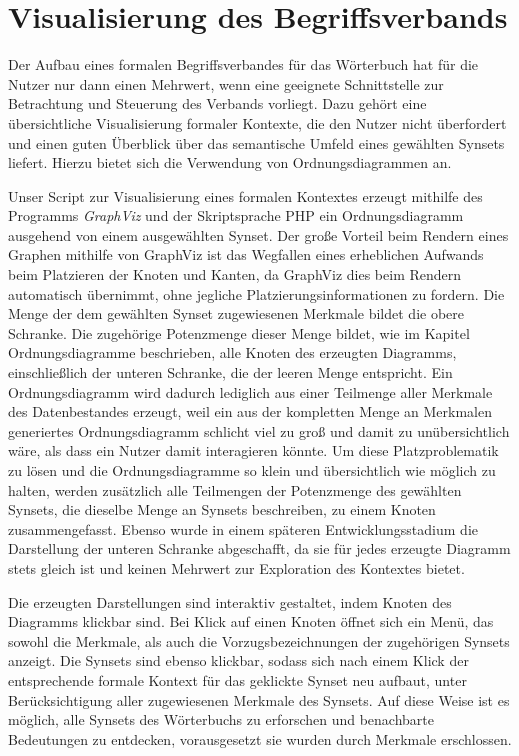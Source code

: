 \documentclass[pagesize,paper=A4,DIV=calc,fontsize=12pt,draft=false]{scrreprt}
\begin{document}
\section{Visualisierung des Begriffsverbands}

Der Aufbau eines formalen Begriffsverbandes für das Wörterbuch hat für die Nutzer nur dann einen Mehrwert, wenn eine geeignete Schnittstelle zur Betrachtung und Steuerung des Verbands vorliegt. 
Dazu gehört eine übersichtliche Visualisierung formaler Kontexte, die den Nutzer nicht überfordert und einen guten Überblick über das semantische Umfeld eines gewählten Synsets liefert.
Hierzu bietet sich die Verwendung von Ordnungsdiagrammen an. 

Unser Script zur Visualisierung eines formalen Kontextes erzeugt mithilfe des Programms \emph{GraphViz} und der Skriptsprache PHP ein Ordnungsdiagramm ausgehend von einem ausgewählten Synset. 
Der große Vorteil beim Rendern eines Graphen mithilfe von GraphViz ist das Wegfallen eines erheblichen Aufwands beim Platzieren der Knoten und Kanten, da GraphViz dies beim Rendern automatisch übernimmt, ohne jegliche Platzierungsinformationen zu fordern. 
Die Menge der dem gewählten Synset zugewiesenen Merkmale bildet die obere Schranke. 
Die zugehörige Potenzmenge dieser Menge bildet, wie im Kapitel Ordnungsdiagramme beschrieben, alle Knoten des erzeugten Diagramms, einschließlich der unteren Schranke, die der leeren Menge entspricht. 
Ein Ordnungsdiagramm wird dadurch lediglich aus einer Teilmenge aller Merkmale des Datenbestandes erzeugt, weil ein aus der kompletten Menge an Merkmalen generiertes Ordnungsdiagramm schlicht viel zu groß und damit zu unübersichtlich wäre, als dass ein Nutzer damit interagieren könnte. 
Um diese Platzproblematik zu lösen und die Ordnungsdiagramme so klein und übersichtlich wie möglich zu halten, werden zusätzlich alle Teilmengen der Potenzmenge des gewählten Synsets, die dieselbe Menge an Synsets beschreiben, zu einem Knoten zusammengefasst. 
Ebenso wurde in einem späteren Entwicklungsstadium die Darstellung der unteren Schranke abgeschafft, da sie für jedes erzeugte Diagramm stets gleich ist und keinen Mehrwert zur Exploration des Kontextes bietet.

Die erzeugten Darstellungen sind interaktiv gestaltet, indem Knoten des Diagramms klickbar sind. 
Bei Klick auf einen Knoten öffnet sich ein Menü, das sowohl die Merkmale, als auch die Vorzugsbezeichnungen der zugehörigen Synsets anzeigt. 
Die Synsets sind ebenso klickbar, sodass sich nach einem Klick der entsprechende formale Kontext für das geklickte Synset neu aufbaut, unter Berücksichtigung aller zugewiesenen Merkmale des Synsets. 
Auf diese Weise ist es möglich, alle Synsets des Wörterbuchs zu erforschen und benachbarte Bedeutungen zu entdecken, vorausgesetzt sie wurden durch Merkmale erschlossen. 
\end{document}
